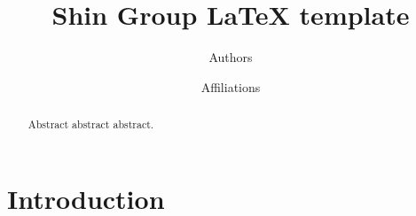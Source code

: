 

\title{Shin Group LaTeX template}
\author{Authors}
\date{
  Affiliations
}

\maketitle
\begin{abstract}
Abstract abstract abstract.
\end{abstract}


\section{Introduction}






